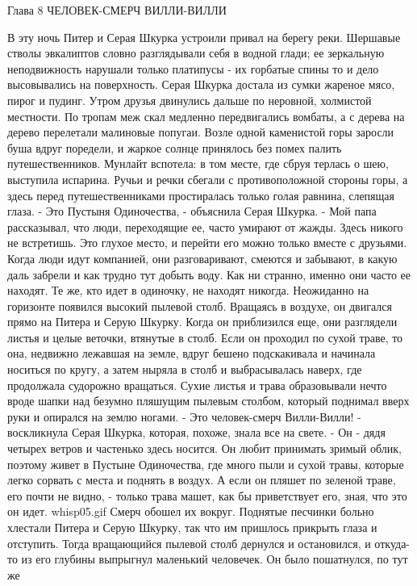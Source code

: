 Глава 8
        ЧЕЛОВЕК-СМЕРЧ ВИЛЛИ-ВИЛЛИ

    В эту ночь Питер и Серая Шкурка устроили привал на берегу реки. 
Шершавые стволы эвкалиптов словно разглядывали себя в водной глади; ее 
зеркальную неподвижность нарушали только платипусы - их горбатые спины 
то и дело высовывались на поверхность. Серая Шкурка достала из сумки 
жареное мясо, пирог и пудинг.
    Утром друзья двинулись дальше по неровной, холмистой местности. По 
тропам меж скал медленно передвигались вомбаты, а с дерева на дерево 
перелетали малиновые попугаи. Возле одной каменистой горы заросли буша 
вдруг поредели, и жаркое солнце принялось без помех палить 
путешественников. Мунлайт вспотела: в том месте, где сбруя терлась о 
шею, выступила испарина. Ручьи и речки сбегали с противоположной 
стороны горы, а здесь перед путешественниками простиралась только 
голая равнина, слепящая глаза.
    - Это Пустыня Одиночества, - объяснила Серая Шкурка. - Мой папа 
рассказывал, что люди, переходящие ее, часто умирают от жажды. Здесь 
никого не встретишь. Это глухое место, и перейти его можно только 
вместе с друзьями. Когда люди идут компанией, они разговаривают, 
смеются и забывают, в какую даль забрели и как трудно тут добыть воду. 
Как ни странно, именно они часто ее находят. Те же, кто идет в 
одиночку, не находят никогда.
    Неожиданно на горизонте появился высокий пылевой столб. Вращаясь в 
воздухе, он двигался прямо на Питера и Серую Шкурку. Когда он 
приблизился еще, они разглядели листья и целые веточки, втянутые в 
столб. Если он проходил по сухой траве, то она, недвижно лежавшая на 
земле, вдруг бешено подскакивала и начинала носиться по кругу, а затем 
ныряла в столб и выбрасывалась наверх, где продолжала судорожно 
вращаться. Сухие листья и трава образовывали нечто вроде шапки над 
безумно пляшущим пылевым столбом, который поднимал вверх руки и 
опирался на землю ногами.
    - Это человек-смерч Вилли-Вилли! - воскликнула Серая Шкурка, 
которая, похоже, знала все на свете. - Он - дядя четырех ветров и 
частенько здесь носится. Он любит принимать зримый облик, поэтому 
живет в Пустыне Одиночества, где много пыли и сухой травы, которые 
легко сорвать с места и поднять в воздух. А если он пляшет по зеленой 
траве, его почти не видно, - только трава машет, как бы приветствует 
его, зная, что это он идет.
    {whisp05.gif}
    Смерч обошел их вокруг. Поднятые песчинки больно хлестали Питера и 
Серую Шкурку, так что им пришлось прикрыть глаза и отступить. Тогда 
вращающийся пылевой столб дернулся и остановился, и откуда-то из его 
глубины выпрыгнул маленький человечек. Он было пошатнулся, по тут же 
